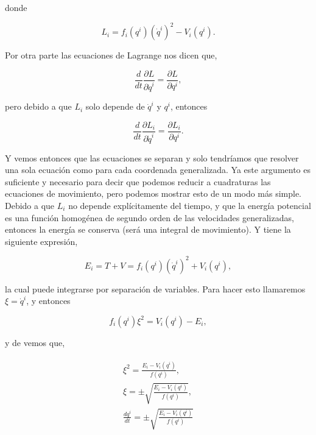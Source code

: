 \documentclass[a4paper,10pt]{article}
\numberwithin{equation}{section}
\begin{document}
donde

\begin{equation}
 L_i = f_i(q^i)(\dot{q}^i)^2 - V_i(q^i).
\end{equation}

Por otra parte las ecuaciones de Lagrange nos dicen que,

\begin{equation}
 \frac{d}{dt} \frac{\partial L}{\partial \dot{q}^i} = \frac{\partial L}{\partial q^i},
\end{equation}

pero debido a que $L_i$ solo depende de $\dot{q}^i$ y $q^i$, entonces

\begin{equation}
 \frac{d}{dt} \frac{\partial L_i}{\partial \dot{q}^i} = \frac{\partial L_i}{\partial q^i}. 
 \label{eq:3ecdeLagrange1}
\end{equation}

Y vemos entonces que las ecuaciones se separan y solo tendríamos que resolver una sola ecuación
como  para cada coordenada generalizada. Ya este argumento es 
suficiente y necesario para decir que podemos reducir a cuadraturas las ecuaciones de 
movimiento, pero podemos mostrar esto de un modo más simple. Debido a que $L_i$ no 
depende explícitamente del tiempo, y que la energía potencial es una función homogénea 
de segundo orden de las velocidades generalizadas, entonces la energía se conserva (será
una integral de movimiento). Y tiene la siguiente expresión,

\begin{equation}
 E_i = T + V = f_i(q^i)(\dot{q}^i)^2 + V_i(q^i),
 \label{eq:3energtotal1}
\end{equation}

la cual puede integrarse por separación de variables. Para hacer esto llamaremos 
$\xi = \dot{q}^i$, y entonces 

\begin{equation}
 f_i(q^i) \xi^2 = V_i(q^i) - E_i,
 \label{eq:3diferencial}
\end{equation}

y de  vemos que,

\begin{align}
 \begin{split}
  \xi^2 = \frac{E_i - V_i(q^i)}{f(q^i)}, \\
  \xi = \pm \sqrt{\frac{E_i - V_i(q^i)}{f(q^i)}}, \\
  \frac{dq^i}{dt} = \pm \sqrt{\frac{E_i - V_i(q^i)}{f(q^i)}}
 \end{split}
\end{align}
\end{document}
